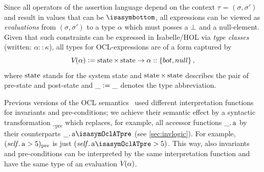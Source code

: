 \isatagannexa
Since all operators of the assertion language depend on the context 
$\tau$ = $(\sigma, \sigma')$ and result in values that can be $\isasymbottom$, 
all expressions can be viewed as \emph{evaluations} from $(\sigma, \sigma')$ to 
a type $\alpha$ which must posses a $\bot$ and a $\text{null}$-element. Given 
that such constraints can be expressed in Isabelle/HOL via \emph{type classes} 
(written: $\alpha::\kappa$), all types for OCL-expressions are of a form captured 
by
\begin{equation*}
 \V{}{\alpha} \defeq \state{} \times \state{} \to \alpha::\{bot,null\}  \mi{,}
 \end{equation*}
where $\state{}$ stands for the system state and $\state{} \times
\state{}$ describes the pair of pre-state and post-state and
$\_\mathrel{\mathop:}=\_$ denotes the type abbreviation.

Previous versions of the OCL semantics~\cite[Annex A]{omg:ocl:2003} used different
interpretation functions for invariants and pre-conditions; we achieve
their semantic effect by a syntactic transformation $\__\text{pre}$
which replaces, for example, all accessor functions
$\getAttrib{\_}{a}$ by their counterparts
$\getAttrib{\_}{a\isasymOclATpre}$ (see \autoref{sec:invlogic}). For example,
$(\getAttrib{\self}{a} > 5)_\text{pre}$ is just
$(\getAttrib{\self}{a\isasymOclATpre} > 5)$. This way, also invariants
and pre-conditions can be interpreted by the same interpretation
function and have the same type of an evaluation $V_{}({\alpha})$.
\endisatagannexa

